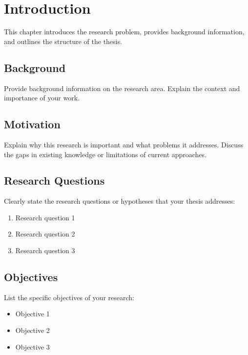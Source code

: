 \chapter{Introduction}
\label{ch:introduction}

This chapter introduces the research problem, provides background information, and outlines the structure of the thesis.

\section{Background}
\label{sec:background}

Provide background information on the research area. Explain the context and importance of your work.

\section{Motivation}
\label{sec:motivation}

Explain why this research is important and what problems it addresses. Discuss the gaps in existing knowledge or limitations of current approaches.

\section{Research Questions}
\label{sec:research-questions}

Clearly state the research questions or hypotheses that your thesis addresses:

\begin{enumerate}
    \item Research question 1
    \item Research question 2
    \item Research question 3
\end{enumerate}

\section{Objectives}
\label{sec:objectives}

List the specific objectives of your research:

\begin{itemize}
    \item Objective 1
    \item Objective 2
    \item Objective 3
\end{itemize}

